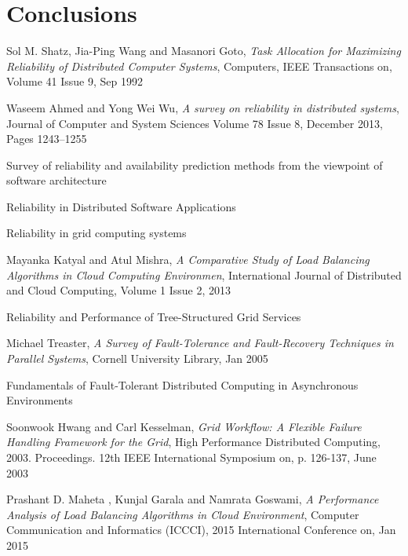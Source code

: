 \documentclass{cslthse-msc}
\begin{document}
\chapter{Conclusions} \label{ch:conclusions}

\begin{thebibliography}{50}

	Sol M. Shatz, Jia-Ping Wang and Masanori Goto,
	\emph{Task Allocation for Maximizing Reliability of Distributed Computer Systems},
	Computers, IEEE Transactions on, Volume 41  Issue 9,
	Sep 1992
	
	Waseem Ahmed and Yong Wei Wu,
	\emph{A survey on reliability in distributed systems},
	Journal of Computer and System Sciences Volume 78 Issue 8,
	December 2013, Pages 1243–1255
	
Survey of reliability and availability prediction methods from the viewpoint of software architecture

Reliability in Distributed Software Applications

Reliability in grid computing systems

	Mayanka Katyal and Atul Mishra,
	\emph{A Comparative Study of Load Balancing Algorithms in Cloud Computing Environmen},
	International Journal of Distributed and Cloud Computing, Volume 1 Issue 2,
	2013
	
Reliability and Performance of Tree-Structured Grid Services

	Michael Treaster,
	\emph{A Survey of Fault-Tolerance and Fault-Recovery Techniques in Parallel Systems},
	Cornell University Library,
	Jan 2005

Fundamentals of Fault-Tolerant Distributed Computing in Asynchronous Environments

	Soonwook Hwang and Carl Kesselman,
	\emph{Grid Workflow: A Flexible Failure Handling Framework for the Grid},
	High Performance Distributed Computing, 2003. Proceedings. 12th IEEE International Symposium on, p. 	126-137, 
	June 2003

	Prashant D. Maheta , Kunjal Garala and Namrata Goswami,
	\emph{A Performance Analysis of Load Balancing Algorithms in Cloud Environment},
	Computer Communication and Informatics (ICCCI), 2015 International Conference on,
	Jan 2015
	

\end{thebibliography}
\end{document}
